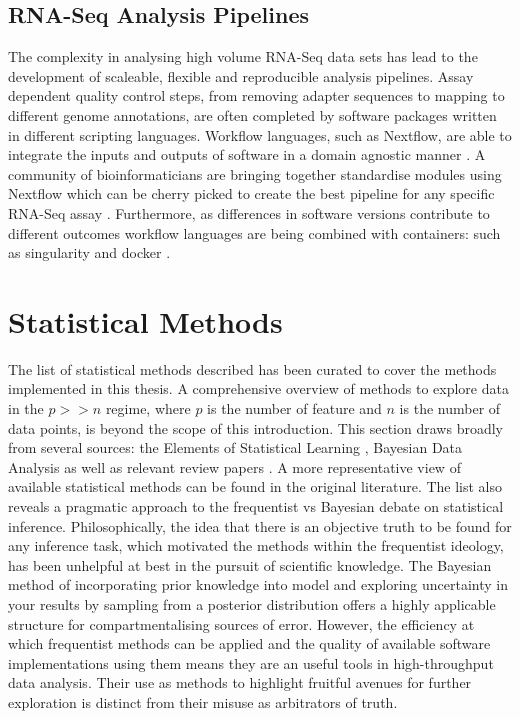 \documentclass[../main.tex]{subfiles}
\begin{document}
\subsection{RNA-Seq Analysis Pipelines}

The complexity in analysing high volume RNA-Seq data sets has lead to the development of scaleable, flexible and reproducible analysis pipelines.
Assay dependent quality control steps, from removing adapter sequences to mapping to different genome annotations, are often completed by software packages written in different scripting languages.
Workflow languages, such as Nextflow, are able to integrate the inputs and outputs of software in a domain agnostic manner \parencite{DiTommaso2017}.
A community of bioinformaticians are bringing together standardise modules using Nextflow which can be cherry picked to create the best pipeline for any specific RNA-Seq assay \parencite{Ewels2020}.
Furthermore, as differences in software versions contribute to different outcomes workflow languages are being combined with containers: such as singularity and docker \parencite{DiTommaso2015}.

\newpage

\section{Statistical Methods}

The list of statistical methods described has been curated to cover the methods implemented in this thesis.
A comprehensive overview of methods to explore data in the $p >> n$ regime, where $p$ is the number of feature and $n$ is the number of data points, is beyond the scope of this introduction.
This section draws broadly from several sources: the Elements of Statistical Learning \parencite{Hastie2009}, Bayesian Data Analysis \parencite{Gelman2014} as well as relevant review papers \parencite{Greener2021, Wu2015}.
A more representative view of available statistical methods can be found in the original literature.
The list also reveals a pragmatic approach to the frequentist vs Bayesian debate on statistical inference.
Philosophically, the idea that there is an objective truth to be found for any inference task, which motivated the methods within the frequentist ideology, has been unhelpful at best in the pursuit of scientific knowledge.
The Bayesian method of incorporating prior knowledge into model and exploring uncertainty in your results by sampling from a posterior distribution offers a highly applicable structure for compartmentalising sources of error.
However, the efficiency at which frequentist methods can be applied and the quality of available software implementations using them means they are an useful tools in high-throughput data analysis.
Their use as methods to highlight fruitful avenues for further exploration is distinct from their misuse as arbitrators of truth. 
\end{document}
